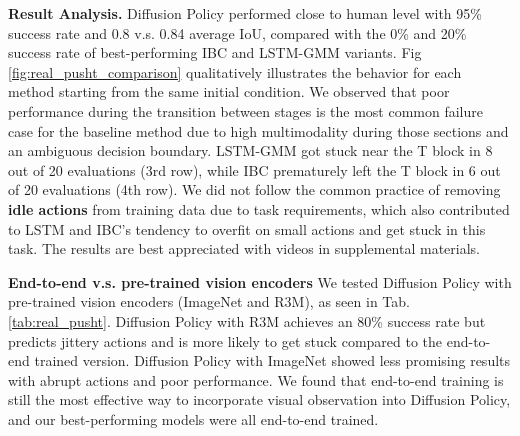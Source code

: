 \textbf{Result Analysis.}
Diffusion Policy performed close to human level with 95\% success rate and 0.8 v.s. 0.84 average IoU, compared with the 0\% and 20\% success rate of best-performing IBC and LSTM-GMM variants. Fig \ref{fig:real_pusht_comparison} qualitatively illustrates the behavior for each method starting from the same initial condition.
We observed that poor performance during the transition between stages is the most common failure case for the baseline method due to high multimodality during those sections and an ambiguous decision boundary. LSTM-GMM got stuck near the T block in 8 out of 20 evaluations (3rd row), while IBC prematurely left the T block in 6 out of 20 evaluations (4th row).
We did not follow the common practice of removing \textbf{idle actions} from training data due to task requirements, which also contributed to LSTM and IBC's tendency to overfit on small actions and get stuck in this task. The results are best appreciated with videos in supplemental materials.







\textbf{End-to-end v.s. pre-trained vision encoders}
We tested Diffusion Policy with pre-trained vision encoders (ImageNet \cite{deng2009imagenet} and R3M\cite{nair2022r3m}), as seen in Tab. \ref{tab:real_pusht}. Diffusion Policy with R3M achieves an 80\% success rate but predicts jittery actions and is more likely to get stuck compared to the end-to-end trained version. Diffusion Policy with ImageNet showed less promising results with abrupt actions and poor performance. We found that end-to-end training is still the most effective way to incorporate visual observation into Diffusion Policy, and our best-performing models were all end-to-end trained.



